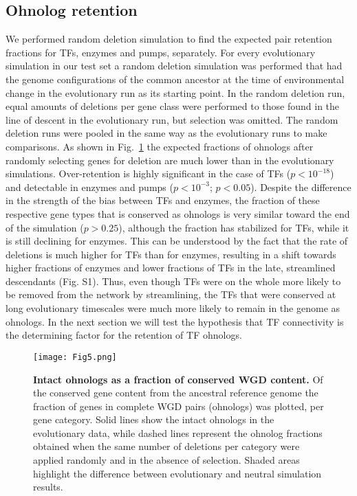 \subsection{Ohnolog retention}
We performed random deletion simulation to find the expected pair retention fractions for TFs, enzymes and pumps, separately. For every evolutionary simulation in our test set a random deletion simulation was performed that had the genome configurations of the common ancestor at the time of environmental change in the evolutionary run as its starting point. In the random deletion run, equal amounts of deletions per gene class were performed to those found in the line of descent in the evolutionary run, but selection was omitted. The random deletion runs were pooled in the same way as the evolutionary runs to make comparisons. As shown in Fig.~\ref{ohnologs} the expected fractions of ohnologs after randomly selecting genes for deletion are much lower than in the evolutionary simulations. Over-retention is highly significant in the case of TFs ($p<10^{-18}$) and detectable in enzymes and pumps ($p<10^{-3}$; $p<0.05$). Despite the difference in the strength of the bias between TFs and enzymes, the fraction of these respective gene types that is conserved as ohnologs is very similar toward the end of the simulation ($p>0.25$), although the fraction has stabilized for TFs, while it is still declining for enzymes. This can be understood by the fact that the rate of deletions is much higher for TFs than for enzymes, resulting in a shift towards higher fractions of enzymes and lower fractions of TFs in the late, streamlined descendants (Fig. S1). Thus, even though TFs were on the whole more likely to be removed from the network by streamlining, the TFs that were conserved at long evolutionary timescales were much more likely to remain in the genome as ohnologs. In the next section we will test the hypothesis that TF connectivity is the determining factor for the retention of TF ohnologs.
\begin{figure}
\begin{center}
\texttt{[image: Fig5.png]}
\end{center}
\caption{\textbf{Intact ohnologs as a fraction of conserved WGD content.} Of the conserved gene content from the ancestral reference genome the fraction of genes in complete WGD pairs (ohnologs) was plotted, per gene category. Solid lines show the intact ohnologs in the evolutionary data, while dashed lines represent the ohnolog fractions obtained when the same number of deletions per category were applied randomly and in the absence of selection. Shaded areas highlight the difference between evolutionary and neutral simulation results.}
\label{ohnologs}
\end{figure}


